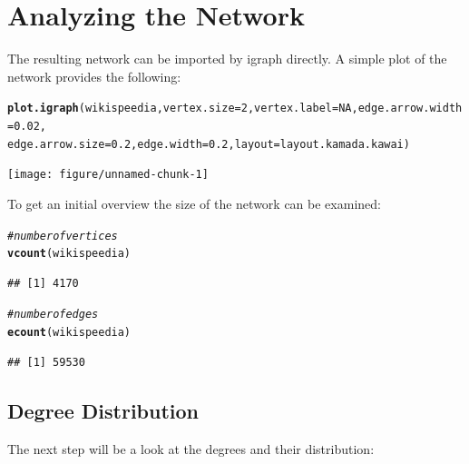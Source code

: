 \documentclass{article}\usepackage[]{graphicx}\usepackage[]{color}
\makeatletter
\newcommand{\hlnum}[1]{\textcolor[rgb]{0.686,0.059,0.569}{#1}}%
\newcommand{\hlcom}[1]{\textcolor[rgb]{0.678,0.584,0.686}{\textit{#1}}}%
\newcommand{\hlstd}[1]{\textcolor[rgb]{0.345,0.345,0.345}{#1}}%
\newcommand{\hlkwc}[1]{\textcolor[rgb]{0.333,0.667,0.333}{#1}}%
\newcommand{\hlkwd}[1]{\textcolor[rgb]{0.737,0.353,0.396}{\textbf{#1}}}%
\newenvironment{kframe}{%
 \def\at@end@of@kframe{}%
 \ifinner\ifhmode%
  \def\at@end@of@kframe{\end{minipage}}%
  \begin{minipage}{\columnwidth}%
 \fi\fi%
 \def\FrameCommand##1{\hskip\@totalleftmargin \hskip-\fboxsep
 \colorbox{shadecolor}{##1}\hskip-\fboxsep
     \hskip-\linewidth \hskip-\@totalleftmargin \hskip\columnwidth}%
 \MakeFramed {\advance\hsize-\width
   \@totalleftmargin\z@ \linewidth\hsize
   \@setminipage}}%
 {\par\unskip\endMakeFramed%
 \at@end@of@kframe}
\newenvironment{knitrout}{}{} %
\makeatother
\begin{document}
\section{Analyzing the Network}
The resulting network can be imported by igraph directly. A simple plot of the network provides the following:
\begin{knitrout}
\color{fgcolor}\begin{kframe}
\begin{alltt}
\hlkwd{plot.igraph}\hlstd{(wikispeedia,} \hlkwc{vertex.size} \hlstd{=} \hlnum{2}\hlstd{,} \hlkwc{vertex.label} \hlstd{=} \hlnum{NA}\hlstd{,} \hlkwc{edge.arrow.width} \hlstd{=} \hlnum{0.02}\hlstd{,}
    \hlkwc{edge.arrow.size} \hlstd{=} \hlnum{0.2}\hlstd{,} \hlkwc{edge.width} \hlstd{=} \hlnum{0.2}\hlstd{,} \hlkwc{layout} \hlstd{= layout.kamada.kawai)}
\end{alltt}
\end{kframe}
\texttt{[image: figure/unnamed-chunk-1]} 

\end{knitrout}



To get an initial overview the size of the network can be examined:
\begin{knitrout}
\color{fgcolor}\begin{kframe}
\begin{alltt}
\hlcom{# number of vertices}
\hlkwd{vcount}\hlstd{(wikispeedia)}
\end{alltt}
\begin{verbatim}
## [1] 4170
\end{verbatim}
\begin{alltt}
\hlcom{# number of edges}
\hlkwd{ecount}\hlstd{(wikispeedia)}
\end{alltt}
\begin{verbatim}
## [1] 59530
\end{verbatim}
\end{kframe}
\end{knitrout}


\subsection{Degree Distribution}
The next step will be a look at the degrees and their distribution:
\end{document}
